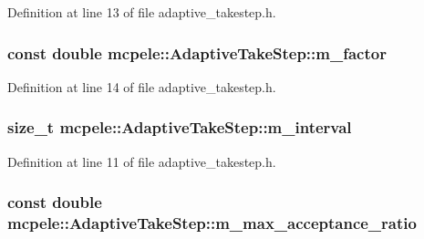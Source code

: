 \-Definition at line 13 of file adaptive\-\_\-takestep.\-h.

\hypertarget{classmcpele_1_1AdaptiveTakeStep_a82892e788ff27d943cb3845210fb9229}{
\subsubsection[{m\-\_\-factor}]{\setlength{\rightskip}{0pt plus 5cm}const double {\bf mcpele\-::\-Adaptive\-Take\-Step\-::m\-\_\-factor}}}\label{classmcpele_1_1AdaptiveTakeStep_a82892e788ff27d943cb3845210fb9229}


\-Definition at line 14 of file adaptive\-\_\-takestep.\-h.

\hypertarget{classmcpele_1_1AdaptiveTakeStep_ac16baa470b559d1c994be4cebc331b90}{
\subsubsection[{m\-\_\-interval}]{\setlength{\rightskip}{0pt plus 5cm}size\-\_\-t {\bf mcpele\-::\-Adaptive\-Take\-Step\-::m\-\_\-interval}}}\label{classmcpele_1_1AdaptiveTakeStep_ac16baa470b559d1c994be4cebc331b90}


\-Definition at line 11 of file adaptive\-\_\-takestep.\-h.

\hypertarget{classmcpele_1_1AdaptiveTakeStep_a2f83a3b74b5a6d515687e5c02292f9c9}{
\subsubsection[{m\-\_\-max\-\_\-acceptance\-\_\-ratio}]{\setlength{\rightskip}{0pt plus 5cm}const double {\bf mcpele\-::\-Adaptive\-Take\-Step\-::m\-\_\-max\-\_\-acceptance\-\_\-ratio}}}\label{classmcpele_1_1AdaptiveTakeStep_a2f83a3b74b5a6d515687e5c02292f9c9}


